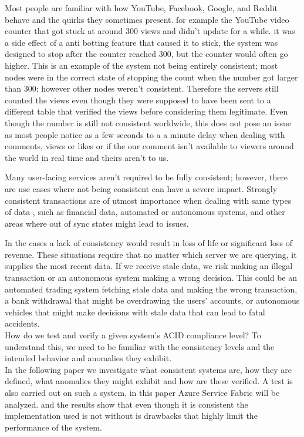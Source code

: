 \documentclass[a4paper,10pt,titlepage]{report}
\begin{document}
    Most people are familiar with how YouTube, Facebook, Google, and Reddit behave and the quirks they sometimes present.
    for example the YouTube video counter that got stuck at around 300 views and didn't update for a while. it was a side effect of a anti botting feature that caused it to stick, the system was designed to stop after the counter reached 300, but the counter would often go higher. This is an example of the system not being entirely consistent; most nodes were in the correct state of stopping the count when the number got larger than 300; however other nodes weren't consistent. Therefore the servers still counted the views even though they were supposed to have been sent to a different table that verified the views before considering them legitimate. Even though the number is still not consistent worldwide, this does not pose an issue as most people notice as a few seconds to a a minute delay when dealing with comments, views or likes or if the our comment isn't available to viewers around the world in real time and theirs aren't to us. 

    Many user-facing services aren't required to be fully consistent; however, there are use cases where not being consistent can have a severe impact. Strongly consistent transactions are of utmost importance when dealing with same types of data , such as financial data, automated or autonomous systems, and other areas where out of sync states might lead to issues.

    In the cases a lack of consistency would result in loss of life or significant loss of revenue. These situations require that no matter which server we are querying, it supplies the most recent data. If we receive stale data, we risk making an illegal transaction or an autonomous system making a wrong decision. This could be an automated trading system fetching stale data and making the wrong transaction, a bank withdrawal that might be overdrawing the users' accounts, or autonomous vehicles that might make decisions with stale data that can lead to fatal accidents. \\

    \vspace{5mm}
    How do we test and verify a given system's ACID compliance level? To understand this, we need to be familiar with the consistency levels and the intended behavior and anomalies they exhibit.\\
    
    In the following paper we investigate what consistent systems are, how they are defined, what anomalies they might exhibit and how are these verified. A test is also carried out on such a system, in this paper Azure Service Fabric will be analyzed. and the results show that even though it is consistent the implementation used is not without is drawbacks that highly limit the performance of the system.
    
\end{document}
